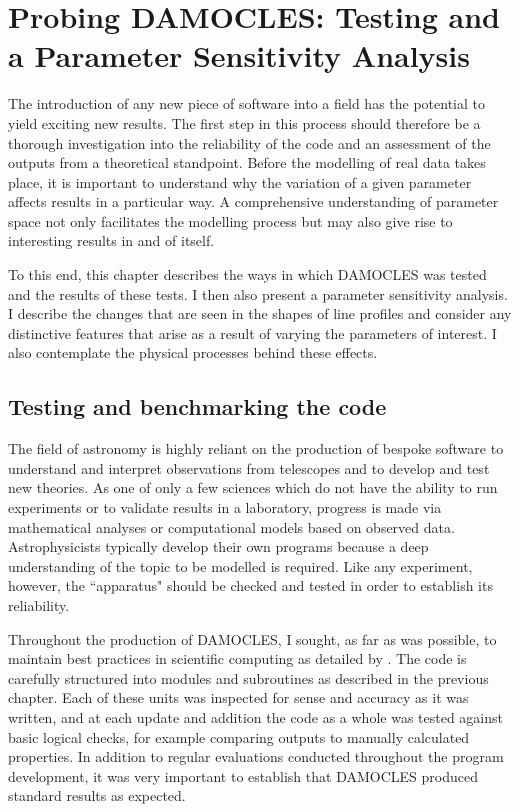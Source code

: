 

%
%
\chapter{Probing DAMOCLES:  Testing and a Parameter Sensitivity Analysis}\label{chp:chp4}

The introduction of any new piece of software into a field has the potential to yield exciting new results.  The first step in this process should therefore be a thorough investigation into the reliability of the code and an assessment of the outputs from a theoretical standpoint.  Before the modelling of real data takes place, it is important to understand why the variation of a  given parameter affects results in a particular way.  A comprehensive understanding of parameter space not only facilitates the modelling process but may also give rise to interesting results in and of itself.

To this end, this chapter describes the ways in which DAMOCLES was tested and the results of these tests.  I then also present a parameter sensitivity analysis.  I describe the changes that are seen in the shapes of line profiles and consider any distinctive features that arise as a result of varying the parameters of interest.  I also contemplate the physical processes behind these effects.


\section{Testing and benchmarking the code}

The field of astronomy is highly reliant on the production of bespoke software to understand and interpret observations from telescopes and to develop and test new theories.  As one of only a few sciences which do not have the ability to run experiments or to validate results in a laboratory, progress is made via mathematical analyses or computational models based on observed data.  Astrophysicists typically develop their own programs because a deep understanding of the topic to be modelled is required.  Like any experiment, however, the ``apparatus" should be checked and tested in order to establish its reliability.

Throughout the production of DAMOCLES, I sought, as far as was possible, to maintain best practices in scientific computing as detailed by \citet{Wilson2012}.  The code is carefully structured into modules and subroutines as described in the previous chapter.  Each of these units was inspected for sense and accuracy as it was written, and at each update and addition the code as a whole was tested against basic logical checks, for example comparing outputs to manually calculated properties.  In addition to regular evaluations conducted throughout the program development, it was very important to establish that DAMOCLES produced standard results as expected.

